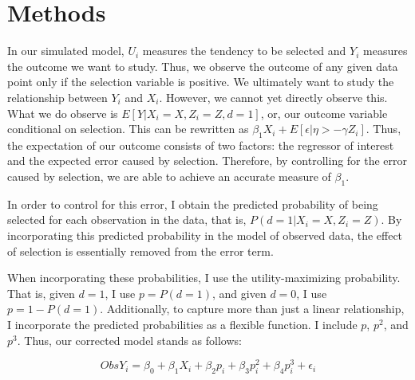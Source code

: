 \documentclass[12pt,english]{article}
\begin{document}
\section{Methods}
In our simulated model, $U_i$ measures the tendency to be selected and $Y_i$ measures the outcome we want to study. Thus, we observe the outcome of any given data point only if the selection variable is positive. We ultimately want to study the relationship between $Y_i$ and $X_i$. However, we cannot yet directly observe this. What we do observe is $E[ Y | X_i = X, Z_i = Z, d = 1]$, or, our outcome variable conditional on selection. This can be rewritten as $\beta_1 X_i + E[\epsilon | \eta > -\gamma Z_i]$. Thus, the expectation of our outcome consists of two factors: the regressor of interest and the expected error caused by selection. Therefore, by controlling for the error caused by selection, we are able to achieve an accurate measure of $\beta_1$.
\par
In order to control for this error, I obtain the predicted probability of being selected for each observation in the data, that is, $P(d = 1 | X_i = X, Z_i = Z)$. By incorporating this predicted probability in the model of observed data, the effect of selection is essentially removed from the error term.
\par
When incorporating these probabilities, I use the utility-maximizing probability. That is, given $d=1$, I use $p = P(d=1)$, and given $d=0$, I use $p = 1- P(d=1)$. Additionally, to capture more than just a linear relationship, I incorporate the predicted probabilities as a flexible function. I include $p$, $p^2$, and $p^3$. Thus, our corrected model stands as follows:

\begin{equation}
    Obs Y_i = \beta_0 + \beta_1 X_i + \beta_2 p_i + \beta_3 p_i^2 + \beta_4 p_i^3 + \epsilon_i
\end{equation}
\end{document}
